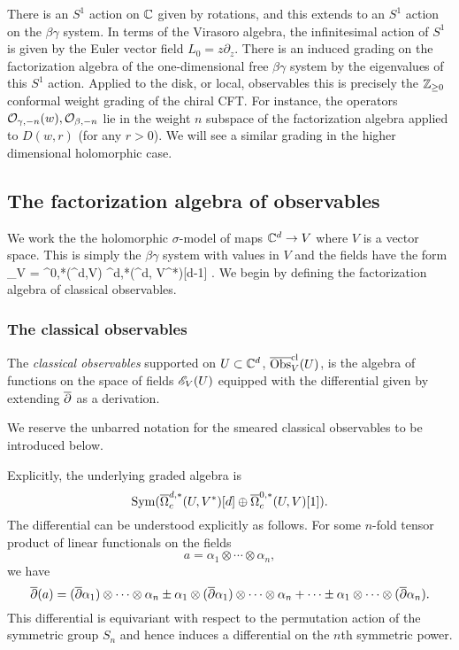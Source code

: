 There is an $S^1$ action on $\mathbb C$ given by rotations, and this extends to an $S^1$ action on the $\beta\gamma$ system.
In terms of the Virasoro algebra, the infinitesimal action of $S^1$ is given by the Euler vector field $L_0 = z \partial_z$. 
There is an induced grading on the factorization algebra of the one-dimensional free $\beta\gamma$ system by the eigenvalues of this $S^1$ action.
Applied to the disk, or local, observables this is precisely the $\mathbb Z_{\geq 0}$ conformal weight grading of the chiral CFT.
For instance, the operators $\mathcal O_{\gamma,-n}(w), \mathcal O_{\beta, -n}$ lie in the weight $n$ subspace of the factorization algebra applied to $D(w,r)$ (for any $r >0$). 
We will see a similar grading in the higher dimensional holomorphic case.

\subsection{The factorization algebra of observables}

We work the the holomorphic $\sigma$-model of maps $\mathbb C^d \to V$ where $V$ is a vector space.
This is simply the $\beta\gamma$ system with values in $V$ and the fields have the form
\ben
\sE_V = \Omega^{0,*}(\CC^d,V) \oplus \Omega^{d,*}(\CC^d, V^*)[d-1] .
\een
We begin by defining the factorization algebra of classical observables.

\subsubsection{The classical observables}

\begin{dfn}
The \emph{classical observables} supported on $U \subset \mathbb C^d$, $\overline{{\rm Obs}}^{{\rm cl}}_V(U)$, is the algebra of functions on the space of fields $\mathscr E_V(U)$ equipped with the differential given by extending $\overline{\partial}$ as a derivation.
\end{dfn}

\begin{rmk}
We reserve the unbarred notation for the smeared classical observables to be introduced below.
\end{rmk}

Explicitly, the underlying graded algebra is
\[
{\rm Sym}(\overline{\Omega}^{d,*}_c(U,V^*)[d] \oplus \overline{\Omega}^{0,*}_c(U,V)[1]).
\]
The differential can be understood explicitly as follows.
For some $n$-fold tensor product of linear functionals on the fields
\[
a = \alpha_1 \otimes \cdots \otimes \alpha_n,
\]
we have
\[
\overline{\partial}(a) = (\overline{\partial} \alpha_1) \otimes \cdots \otimes \alpha_n \pm \alpha_1 \otimes (\overline{\partial} \alpha_1) \otimes \cdots \otimes \alpha_n + \cdots \pm\alpha_1 \otimes \cdots \otimes (\overline{\partial} \alpha_n).
\]
This differential is equivariant with respect to the permutation action of the symmetric group $S_n$ and 
hence induces a differential on the $n$th symmetric power.

